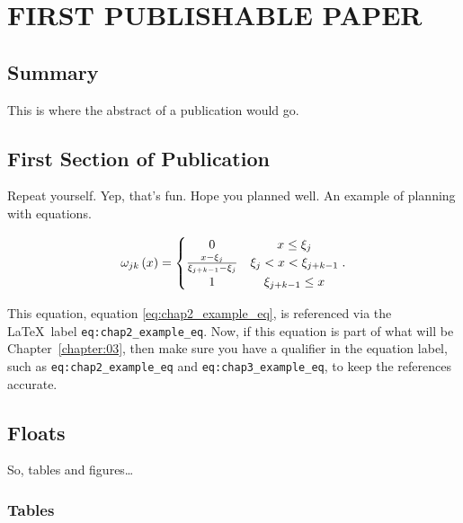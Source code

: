\chapter{\uppercase{First Publishable Paper} \label{chapter:02}}

\section{Summary}
This is where the abstract of a publication would go.

\section{First Section of Publication}
Repeat yourself.  Yep, that's fun.  Hope you planned well.  An example of
planning with equations.

\begin{equation}
\label{eq:chap2_example_eq}
  \omega_{jk}\left(x\right) =
  \begin{cases}
  \hfil 0                                        & \hfil x \leq \xi_{j} \\
  \frac{x - \xi_{j}} {\xi_{j + k - 1} - \xi_{j}} & \xi_{j} < x < \xi_{j+ k - 1} \\
  \hfil 1                                        & \hfil \xi_{j + k - 1} \leq x
  \end{cases}.
\end{equation}

This equation, equation \eqref{eq:chap2_example_eq}, is referenced via the \LaTeX\
label {\tt eq:chap2\_example\_eq}.  Now, if this equation is part of what will be
Chapter~\ref{chapter:03}, then make sure you have a qualifier in the equation
label, such as {\tt eq:chap2\_example\_eq} and {\tt eq:chap3\_example\_eq}, to
keep the references accurate.


\section{Floats}

So, tables and figures\ldots
\lipsum

\subsection{Tables}

\lipsum[1]


